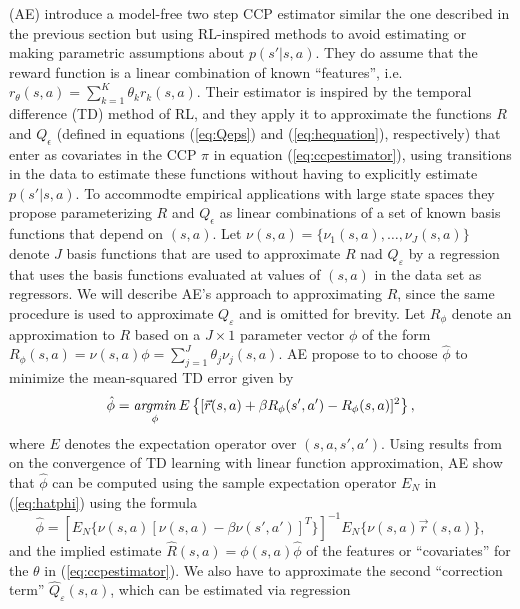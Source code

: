 \citet{ae:2022} (AE) introduce a model-free two step CCP estimator similar
the one  described in the previous section but using RL-inspired methods to
avoid estimating or making parametric assumptions about $p(s'|s,a)$. They do assume 
that the reward function is a linear combination of known ``features'', i.e. $r_\theta(s,a)=\sum_{k=1}^K \theta_k r_k(s,a)$.
Their estimator is inspired by the temporal difference (TD) method of RL,
and they apply it to approximate the functions $R$ and $Q_\epsilon$ 
(defined in equations (\ref{eq:Qeps}) and (\ref{eq:hequation}), respectively) that
enter as covariates in the CCP $\pi$ in equation (\ref{eq:ccpestimator}), using
transitions in the data to estimate these functions 
without having to explicitly estimate $p(s'|s,a)$. To  accommodte 
empirical applications with large state spaces they propose parameterizing $R$ and $Q_\epsilon$ as linear
combinations of a set of known basis functions that depend on $(s,a)$. Let $\nu(s,a)=\{\nu_1(s,a),\ldots,\nu_J(s,a)\}$
denote $J$ basis functions that are used to approximate $R$ nad $Q_\varepsilon$ by a regression that uses the
basis functions evaluated at values of $(s,a)$ in the data set as regressors.  We will describe AE's approach
to approximating $R$, since the same procedure is used to approximate $Q_\varepsilon$ and is omitted
for brevity. Let  $R_\phi$ denote an approximation to $R$ based
on a $J \times 1$ parameter vector $\phi$ of the form $R_\phi(s,a)=\nu(s,a)\phi=\sum_{j=1}^J \theta_j\nu_j(s,a)$. AE propose to 
to choose $\hat\phi$ to minimize the mean-squared TD error given by
\begin{equation}
     \hat\phi =\mathop{\it argmin}_\phi E\left\{ [\vec{r}(s,a)+\beta R_\phi(s',a')-R_\phi(s,a)]^2\right\},
\label{eq:hatphi}
\end{equation}
where $E$ denotes the expectation operator over $(s,a,s',a')$.
Using results from \citet{TsitsiklisVanRoy:1997} on the convergence of TD learning with linear function approximation, 
AE show that $\hat\phi$ can be computed using the sample expectation operator $E_N$ in (\ref{eq:hatphi})
using the formula
\begin{equation}
     \hat\phi = \left[E_N\{\nu(s,a)[\nu(s,a)-\beta\nu(s',a')]^{{\scriptscriptstyle T}}\}\right]^{-1} E_N\{\nu(s,a)\vec{r}(s,a)\},
\label{eq:QR_regression}
\end{equation}
and the implied estimate $\hat R(s,a)=\phi(s,a)\hat\phi$ of the features or 
``covariates'' for the $\theta$ in (\ref{eq:ccpestimator}). We also have to approximate the 
second ``correction term''  $\hat Q_\varepsilon(s,a)$, which can be estimated via  regression
